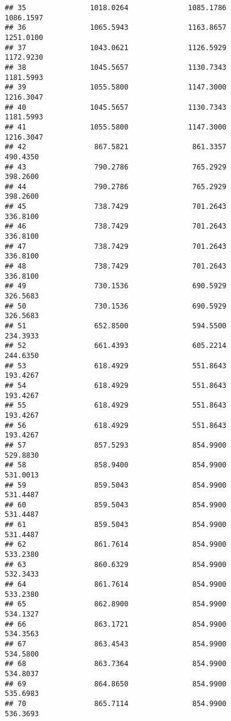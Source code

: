 \documentclass[]{article}
\begin{document}
\begin{verbatim}
## 35               1018.0264              1085.1786           1086.1597
## 36               1065.5943              1163.8657           1251.0100
## 37               1043.0621              1126.5929           1172.9230
## 38               1045.5657              1130.7343           1181.5993
## 39               1055.5800              1147.3000           1216.3047
## 40               1045.5657              1130.7343           1181.5993
## 41               1055.5800              1147.3000           1216.3047
## 42                867.5821               861.3357            490.4350
## 43                790.2786               765.2929            398.2600
## 44                790.2786               765.2929            398.2600
## 45                738.7429               701.2643            336.8100
## 46                738.7429               701.2643            336.8100
## 47                738.7429               701.2643            336.8100
## 48                738.7429               701.2643            336.8100
## 49                730.1536               690.5929            326.5683
## 50                730.1536               690.5929            326.5683
## 51                652.8500               594.5500            234.3933
## 52                661.4393               605.2214            244.6350
## 53                618.4929               551.8643            193.4267
## 54                618.4929               551.8643            193.4267
## 55                618.4929               551.8643            193.4267
## 56                618.4929               551.8643            193.4267
## 57                857.5293               854.9900            529.8830
## 58                858.9400               854.9900            531.0013
## 59                859.5043               854.9900            531.4487
## 60                859.5043               854.9900            531.4487
## 61                859.5043               854.9900            531.4487
## 62                861.7614               854.9900            533.2380
## 63                860.6329               854.9900            532.3433
## 64                861.7614               854.9900            533.2380
## 65                862.8900               854.9900            534.1327
## 66                863.1721               854.9900            534.3563
## 67                863.4543               854.9900            534.5800
## 68                863.7364               854.9900            534.8037
## 69                864.8650               854.9900            535.6983
## 70                865.7114               854.9900            536.3693

\end{verbatim}
\end{document}

